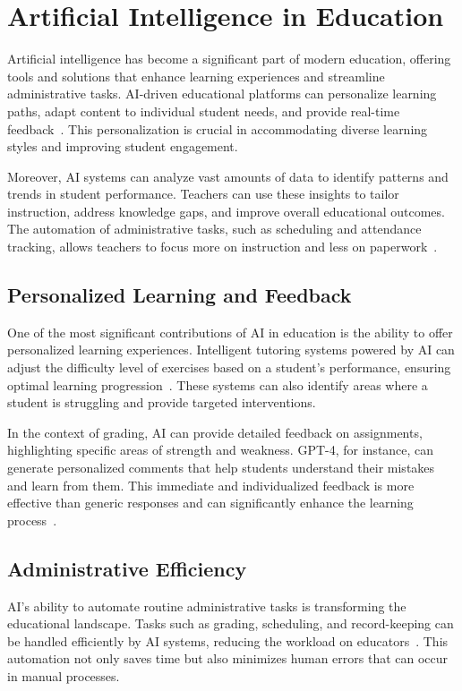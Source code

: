 \documentclass[ms,twoside,print]{nuthesis}
\begin{document}
\section{Artificial Intelligence in Education}

Artificial intelligence has become a significant part of modern education, offering tools and solutions that enhance learning experiences and streamline administrative tasks. AI-driven educational platforms can personalize learning paths, adapt content to individual student needs, and provide real-time feedback~\cite{Alto2023}. This personalization is crucial in accommodating diverse learning styles and improving student engagement.

Moreover, AI systems can analyze vast amounts of data to identify patterns and trends in student performance. Teachers can use these insights to tailor instruction, address knowledge gaps, and improve overall educational outcomes. The automation of administrative tasks, such as scheduling and attendance tracking, allows teachers to focus more on instruction and less on paperwork~\cite{Chen2020}.

\subsection{Personalized Learning and Feedback}

One of the most significant contributions of AI in education is the ability to offer personalized learning experiences. Intelligent tutoring systems powered by AI can adjust the difficulty level of exercises based on a student's performance, ensuring optimal learning progression~\cite{Alto2023}. These systems can also identify areas where a student is struggling and provide targeted interventions.

In the context of grading, AI can provide detailed feedback on assignments, highlighting specific areas of strength and weakness. GPT-4, for instance, can generate personalized comments that help students understand their mistakes and learn from them. This immediate and individualized feedback is more effective than generic responses and can significantly enhance the learning process~\cite{Luckin2016}.

\subsection{Administrative Efficiency}

AI's ability to automate routine administrative tasks is transforming the educational landscape. Tasks such as grading, scheduling, and record-keeping can be handled efficiently by AI systems, reducing the workload on educators~\cite{Alto2023}. This automation not only saves time but also minimizes human errors that can occur in manual processes.
\end{document}
